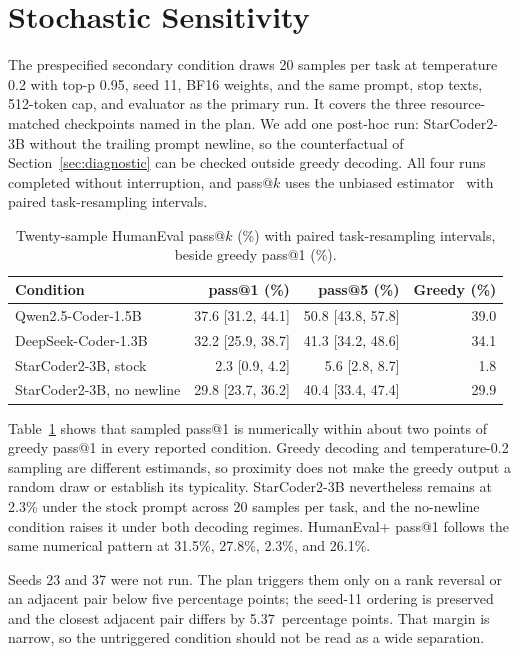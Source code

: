 \documentclass[10pt,twocolumn]{article}
\newcommand{\pp}{percentage points}
\begin{document}
\section{Stochastic Sensitivity}
\label{sec:sampling}

The prespecified secondary condition draws 20 samples per task at temperature 0.2 with top-p 0.95, seed 11, BF16 weights, and the same prompt, stop texts, 512-token cap, and evaluator as the primary run. It covers the three resource-matched checkpoints named in the plan. We add one post-hoc run: StarCoder2-3B without the trailing prompt newline, so the counterfactual of Section~\ref{sec:diagnostic} can be checked outside greedy decoding. All four runs completed without interruption, and pass@$k$ uses the unbiased estimator~\citep{chen2021humaneval} with paired task-resampling intervals.

\begin{table}[t]
\centering
\caption{Twenty-sample HumanEval pass@$k$ (\%) with paired task-resampling intervals, beside greedy pass@1 (\%).}
\label{tab:sampling}
\scriptsize
\begin{tabularx}{\columnwidth}{@{}Xrrr@{}}
\toprule
Condition & pass@1 (\%) & pass@5 (\%) & Greedy (\%) \\
\midrule
Qwen2.5-Coder-1.5B & 37.6 [31.2, 44.1] & 50.8 [43.8, 57.8] & 39.0 \\
DeepSeek-Coder-1.3B & 32.2 [25.9, 38.7] & 41.3 [34.2, 48.6] & 34.1 \\
StarCoder2-3B, stock & 2.3 [0.9, 4.2] & 5.6 [2.8, 8.7] & 1.8 \\
StarCoder2-3B, no newline & 29.8 [23.7, 36.2] & 40.4 [33.4, 47.4] & 29.9 \\
\bottomrule
\end{tabularx}
\end{table}

Table~\ref{tab:sampling} shows that sampled pass@1 is numerically within about two points of greedy pass@1 in every reported condition. Greedy decoding and temperature-0.2 sampling are different estimands, so proximity does not make the greedy output a random draw or establish its typicality. StarCoder2-3B nevertheless remains at 2.3\% under the stock prompt across 20 samples per task, and the no-newline condition raises it under both decoding regimes. HumanEval+ pass@1 follows the same numerical pattern at 31.5\%, 27.8\%, 2.3\%, and 26.1\%.

Seeds 23 and 37 were not run. The plan triggers them only on a rank reversal or an adjacent pair below five \pp{}; the seed-11 ordering is preserved and the closest adjacent pair differs by 5.37~\pp{}. That margin is narrow, so the untriggered condition should not be read as a wide separation.
\end{document}
